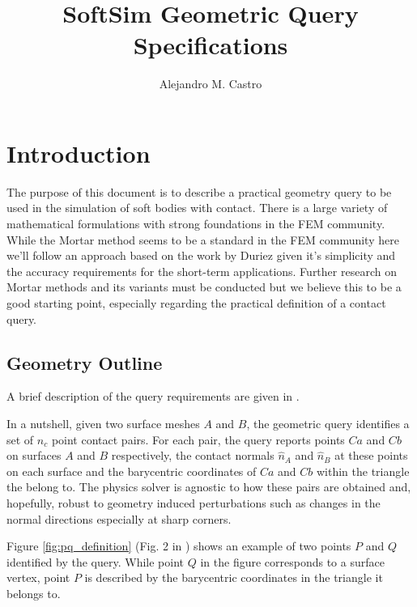 \documentclass[a4paper]{article}
\title{SoftSim Geometric Query Specifications}
\author{Alejandro M. Castro}
\newcommand{\smalltodo}[2][]
{\todo[caption={#2}, #1]
	{\begin{spacing}{0.5}#2\end{spacing}}}
\newcommand{\AlejandroComment}[2][]{\smalltodo[color=purple!40,
author=Alejandro, #1]{#2}{}}
\begin{document}
\maketitle


\section{Introduction}

The purpose of this document is to describe a practical geometry query to be
\AlejandroComment{A comment with my name and fav color}
used in the simulation of soft bodies with contact. There is a large variety of
mathematical formulations with strong foundations in the FEM community. While
the Mortar method seems to be a standard in the FEM community
\cite{bib:yang2005, bib:delorenzis2014, bib:fischer2006, bib:popp2010} here
we'll follow an approach based on the work by Duriez
\cite{bib:duriez2006_realistic_haptic_rendering} given it's simplicity and the
accuracy requirements for the short-term applications. Further research on
Mortar methods and its variants must be conducted but we believe this to be a
good starting point, especially regarding the practical definition of a contact query.

\subsection{Geometry Outline}
A brief description of the query requirements are given in 
\cite[\S 3.2]{bib:duriez2006_realistic_haptic_rendering}.

In a nutshell, given two surface meshes $A$ and $B$, the geometric query identifies a set of
$n_c$ point contact pairs. For each pair, the query reports points $Ca$ and $Cb$
on surfaces $A$ and $B$ respectively, the contact normals $\widehat{n}_A$ and
$\widehat{n}_B$ at these points on each surface and the barycentric coordinates
of $Ca$ and $Cb$ within the triangle the belong to. The physics solver is agnostic to
how these pairs are obtained and, hopefully, robust to geometry induced
perturbations such as changes in the normal directions especially at sharp
corners.

Figure \ref{fig:pq_definition} (Fig. 2 in
\cite{bib:duriez2006_realistic_haptic_rendering}) shows an example of two points
$P$ and $Q$ identified by the query. While point $Q$ in the figure corresponds
to a surface vertex, point $P$ is described by the barycentric coordinates in
the triangle it belongs to.
\end{document}
